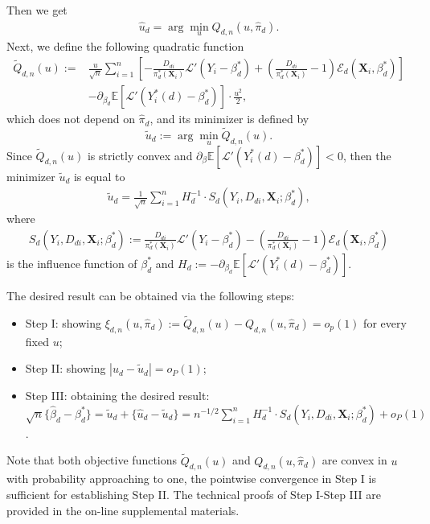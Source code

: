 \documentclass[11pt]{article}
\numberwithin{equation}{section}
\begin{document}
Then we get
\begin{align*}
	\widehat{u}_d=\arg\min_{u} Q_{d,n}(u,\widehat{\pi}_d).
\end{align*}
Next, we define the following quadratic function
\begin{align*}
	\widetilde{Q}_{d,n}(u):=&\frac{u}{\sqrt{n}}\sum_{i=1}^n\left[-\frac{D_{di}}{{\pi}^*_d(\boldsymbol{X}_{i})}\mathcal{L}'(Y_i-\beta_d^*)+\left(\frac{D_{di}}{\pi_d^*(\boldsymbol{X}_{i})}-1\right)\mathcal{E}_{d}(\boldsymbol{X}_{i},\beta_d^*) \right]\\
	&-\partial_{\beta_d}\mathbb{E}[\mathcal{L}'(Y^*_i(d)-\beta_d^*)]\cdot \frac{u^2}{2},
\end{align*}
which does not depend on $\widehat{\pi}_d$, and its minimizer is defined by
$$\widetilde{u}_{d}:=\arg\min_{u} \widetilde{Q}_{d,n}(u).$$
Since $\widetilde{Q}_{d,n}(u)$ is strictly convex and $\partial_{\beta}\mathbb{E}[\mathcal{L}'(Y^*_i(d)-\beta_d^*)]<0$, then the minimizer $\widetilde{u}_d$ is equal to
\begin{align*}
	\widetilde{u}_{d}=\frac{1}{\sqrt{n}}\sum_{i=1}^nH_d^{-1}\cdot S_d(Y_i,D_{di},\boldsymbol{X}_{i};\beta_d^*),
\end{align*}
where
\begin{align*}
	S_d(Y_i,D_{di},\boldsymbol{X}_{i};\beta_d^*):=\frac{D_{di}}{{\pi}^*_d(\boldsymbol{X}_{i})}\mathcal{L}'(Y_i-\beta_d^*)-\left(\frac{D_{di}}{\pi_d^*(\boldsymbol{X}_{i})}-1\right)\mathcal{E}_{d}(\boldsymbol{X}_{i},\beta_d^*)
\end{align*}
is the influence function of $\beta_d^*$ and $H_d:=-\partial_{\beta_d}\mathbb{E}[\mathcal{L}'(Y^*_i(d)-\beta_d^*)]$.

The desired result can be obtained via the following steps:
\begin{itemize}
	\item Step I: showing $\xi_{d,n}(u,\widehat{\pi}_d):=\widetilde{Q}_{d,n}(u)-Q_{d,n}(u,\widehat{\pi}_d)=o_p(1)$ for every fixed $u$;
	\item Step II: showing $|\widehat{u}_{d}-\widetilde{u}_{d}|=o_P(1)$;
	\item Step III: obtaining the desired result: \newline
	$\sqrt{n}\{\widehat{\beta}_d-\beta_d^*\}=\widetilde{u}_{d}+\{\widehat{u}_{d}-\widetilde{u}_{d}\}=n^{-1/2}\sum_{i=1}^nH_d^{-1}\cdot S_d(Y_i,D_{di},\boldsymbol{X}_{i};\beta_d^*)+o_P(1)$.
\end{itemize}
Note that both objective functions $\widetilde{Q}_{d,n}(u)$ and $Q_{d,n}(u,\widehat{\pi}_d)$ are convex in $u$ with probability approaching to one, the pointwise  convergence in Step I is sufficient for establishing Step II. The technical proofs of Step I-Step III are provided in the on-line supplemental materials.
\end{document}
